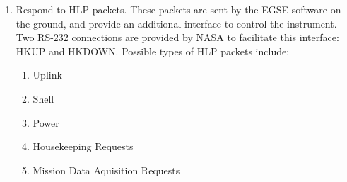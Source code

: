\begin{enumerate}
  \item Respond to HLP packets. These packets are sent by the EGSE software on the ground, and provide an additional interface to control the instrument. Two RS-232 connections are provided by NASA to facilitate this interface: HKUP and HKDOWN. Possible types of HLP packets include:
	\begin{enumerate}
		\item Uplink
		\item Shell
		\item Power
		\item Housekeeping Requests
		\item Mission Data Aquisition Requests
	\end{enumerate}
	
\end{enumerate}

